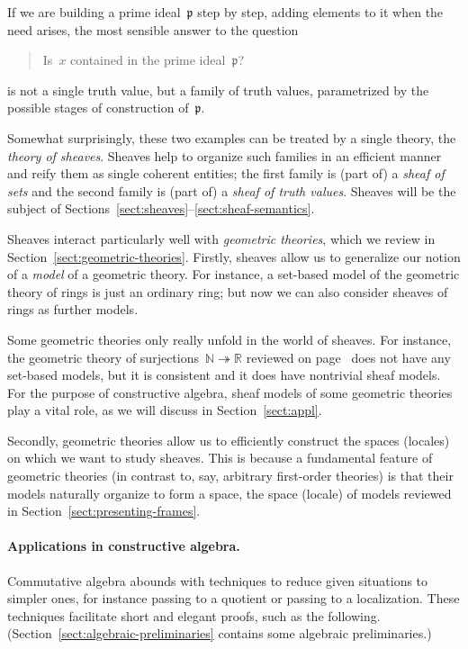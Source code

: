 \documentclass{ws-rv9x6}
\newcommand{\NN}{\mathbb{N}}
\newcommand{\RR}{\mathbb{R}}
\newcommand{\ppp}{\mathfrak{p}}
\renewcommand{\_}{\mathpunct{.}}
\newcommand{\?}{\,{:}\,}
\begin{document}
If we are building a prime ideal~$\ppp$ step by step, adding elements to it
when the need arises, the most sensible answer to the question
\begin{quote}
Is~$x$ contained in the prime ideal~$\ppp$?
\end{quote}
is not a single truth value, but a family of truth values, parametrized by the
possible stages of construction of~$\ppp$.

Somewhat surprisingly, these two examples can be treated by a single theory,
the \emph{theory of sheaves}. Sheaves help to organize such families in an
efficient manner and reify them as single coherent entities; the first family
is (part of) a \emph{sheaf of sets} and the second family is (part of) a
\emph{sheaf of truth values}. Sheaves will be the subject of
Sections~\ref{sect:sheaves}--\ref{sect:sheaf-semantics}.

Sheaves interact particularly well with \emph{geometric theories}, which we
review in Section~\ref{sect:geometric-theories}. Firstly, sheaves allow us to
generalize our notion of a \emph{model} of a geometric theory. For instance, a
set-based model of the geometric theory of rings is just an ordinary ring; but
now we can also consider sheaves of rings as further models.

Some geometric theories only really unfold in the world of sheaves. For
instance, the geometric theory of surjections~$\NN \twoheadrightarrow \RR$
reviewed on page~\pageref{item:theory-of-surjections} does not have any
set-based models, but it is consistent and it does have nontrivial sheaf
models. For the purpose of constructive algebra, sheaf models of some geometric
theories play a vital role, as we will discuss in Section~\ref{sect:appl}.

Secondly, geometric theories allow us to efficiently construct the spaces
(locales) on which we want to study sheaves. This is because a fundamental
feature of geometric theories (in contrast to, say, arbitrary first-order
theories) is that their models naturally organize to form a space, the
space (locale) of models reviewed in Section~\ref{sect:presenting-frames}.



\paragraph{Applications in constructive algebra.}
\label{par:appl-constr-alg}
Commutative algebra abounds with techniques to reduce given situations to
simpler ones, for instance passing to a quotient or passing to a
localization. These techniques facilitate short and elegant proofs, such as the
following. (Section~\ref{sect:algebraic-preliminaries} contains some algebraic
preliminaries.)
\end{document}
